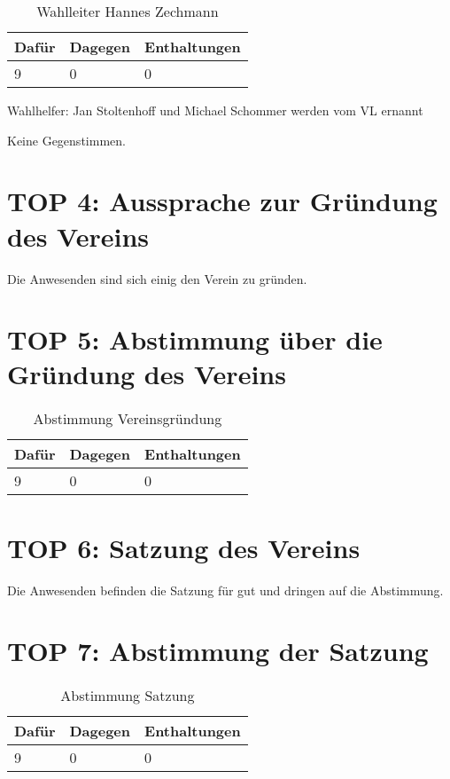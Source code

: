 \documentclass[a4paper]{scrartcl}
\begin{document}
\begin{table}[h]
\begin{tabularx}{\textwidth}{XXX}
Dafür & Dagegen & Enthaltungen\\
\toprule
9 & 0 & 0\\
\end{tabularx}
\caption{Wahlleiter Hannes Zechmann}
\end{table}

Wahlhelfer: Jan Stoltenhoff und Michael Schommer werden vom VL ernannt

Keine Gegenstimmen.

\clearpage

\section{TOP 4: Aussprache zur Gründung des Vereins}
Die Anwesenden sind sich einig den Verein zu gründen.

\section{TOP 5: Abstimmung über die Gründung des Vereins}

\begin{table}[h]
\begin{tabularx}{\textwidth}{XXX}
Dafür & Dagegen & Enthaltungen\\
\toprule
9 & 0 & 0\\
\end{tabularx}
\caption{Abstimmung Vereinsgründung}
\end{table}

\clearpage

\section{TOP 6: Satzung des Vereins}
Die Anwesenden befinden die Satzung für gut und dringen auf die Abstimmung.
\section{TOP 7: Abstimmung der Satzung}
\begin{table}[h]
\begin{tabularx}{\textwidth}{XXX}
Dafür & Dagegen & Enthaltungen\\
\toprule
9 & 0 & 0\\
\end{tabularx}
\caption{Abstimmung Satzung}
\end{table}
\end{document}
